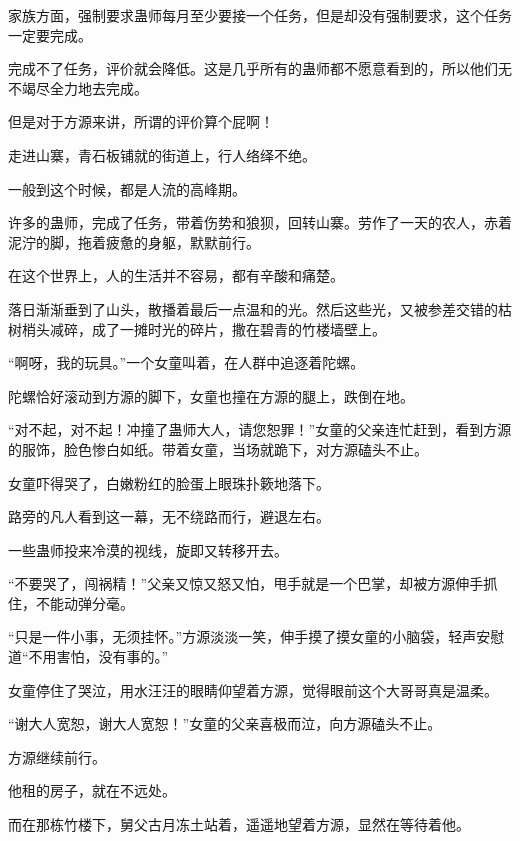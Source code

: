 \begin{this_body}
家族方面，强制要求蛊师每月至少要接一个任务，但是却没有强制要求，这个任务一定要完成。

完成不了任务，评价就会降低。这是几乎所有的蛊师都不愿意看到的，所以他们无不竭尽全力地去完成。

但是对于方源来讲，所谓的评价算个屁啊！

走进山寨，青石板铺就的街道上，行人络绎不绝。

一般到这个时候，都是人流的高峰期。

许多的蛊师，完成了任务，带着伤势和狼狈，回转山寨。劳作了一天的农人，赤着泥泞的脚，拖着疲惫的身躯，默默前行。

在这个世界上，人的生活并不容易，都有辛酸和痛楚。

落日渐渐垂到了山头，散播着最后一点温和的光。然后这些光，又被参差交错的枯树梢头减碎，成了一摊时光的碎片，撒在碧青的竹楼墙壁上。

“啊呀，我的玩具。”一个女童叫着，在人群中追逐着陀螺。

陀螺恰好滚动到方源的脚下，女童也撞在方源的腿上，跌倒在地。

“对不起，对不起！冲撞了蛊师大人，请您恕罪！”女童的父亲连忙赶到，看到方源的服饰，脸色惨白如纸。带着女童，当场就跪下，对方源磕头不止。

女童吓得哭了，白嫩粉红的脸蛋上眼珠扑簌地落下。

路旁的凡人看到这一幕，无不绕路而行，避退左右。

一些蛊师投来冷漠的视线，旋即又转移开去。

“不要哭了，闯祸精！”父亲又惊又怒又怕，甩手就是一个巴掌，却被方源伸手抓住，不能动弹分毫。

“只是一件小事，无须挂怀。”方源淡淡一笑，伸手摸了摸女童的小脑袋，轻声安慰道“不用害怕，没有事的。”

女童停住了哭泣，用水汪汪的眼睛仰望着方源，觉得眼前这个大哥哥真是温柔。

“谢大人宽恕，谢大人宽恕！”女童的父亲喜极而泣，向方源磕头不止。

方源继续前行。

他租的房子，就在不远处。

而在那栋竹楼下，舅父古月冻土站着，遥遥地望着方源，显然在等待着他。

\end{this_body}

